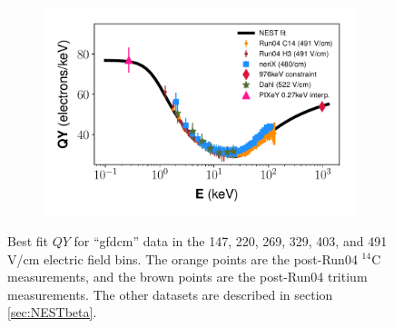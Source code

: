 \begin{figure}[h!]
\begin{subfigure}{0.5\textwidth}
  \caption{}
\end{subfigure}%
\begin{subfigure}{0.5\textwidth}
  \centering
  \includegraphics[width=\textwidth]{Figures/Yields_fit_old/NEST_fit_491Vcm_old.pdf}
  \caption{}
\end{subfigure}
\caption{Best fit $QY$ for ``gfdcm'' data in the 147, 220, 269, 329, 403, and 491 V/cm electric field bins. The orange points are the post-Run04 $^{14}$C measurements, and the brown points are the post-Run04 tritium measurements. The other datasets are described in section \ref{sec:NESTbeta}.}
\label{fig:gfdcm_prelim_QY2}
\end{figure}

 
 
